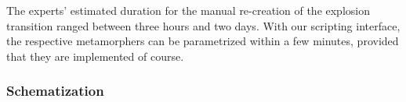 The experts' estimated duration for the manual re-creation of the explosion transition ranged between three hours and two days. With our scripting interface, the respective metamorphers can be parametrized within a few minutes, provided that they are implemented of course.




\subsubsection{Schematization}









